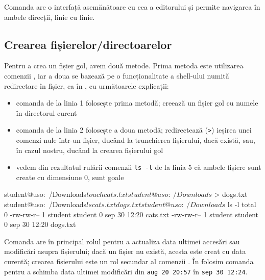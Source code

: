 Comanda  are o interfață asemănătoare cu cea a editorului  și permite navigarea în ambele direcții, linie cu linie.

\subsection{Crearea fișierelor/directoarelor}
\label{sec:fs:file-create}

Pentru a crea un fișier gol, avem două metode. Prima metoda este utilizarea comenzii , iar a doua se bazează pe o funcționalitate a shell-ului numită redirectare în fișier, ca în , cu următoarele explicații:
\begin{itemize}
  \item comanda de la linia 1 folosește prima metodă; creează un fișier gol cu numele  în directorul curent
  \item comanda de la linia 2 folosește a doua metodă; redirectează (\texttt{>}) ieșirea unei comenzi nule într-un fișier, ducând la trunchierea fișierului, dacă există, sau, în cazul nostru, ducând la crearea fișierului gol 
  \item vedem din rezultatul rulării comenzii \texttt{ls -l} de la linia 5 că ambele fișiere sunt create cu dimensiune 0, sunt goale
\end{itemize}

\begin{screen}[caption={Crearea unui fișier},label={lst:fs:create-file}]
student@uso:~/Downloads$ touch cats.txt
student@uso:~/Downloads$ > dogs.txt
student@uso:~/Downloads$ ls
cats.txt  dogs.txt
student@uso:~/Downloads$ ls -l
total 0
-rw-rw-r-- 1 student student 0 sep 30 12:20 cats.txt
-rw-rw-r-- 1 student student 0 sep 30 12:20 dogs.txt
\end{screen}

Comanda  are în principal rolul pentru a actualiza data ultimei accesări sau modificări asupra fișierului; dacă un fișier nu există, acesta este creat cu data curentă; crearea fișierului este un rol secundar al comenzii . În  folosim comanda  pentru a schimba data ultimei modificări din \texttt{aug 20 20:57} în \texttt{sep 30 12:24}.


